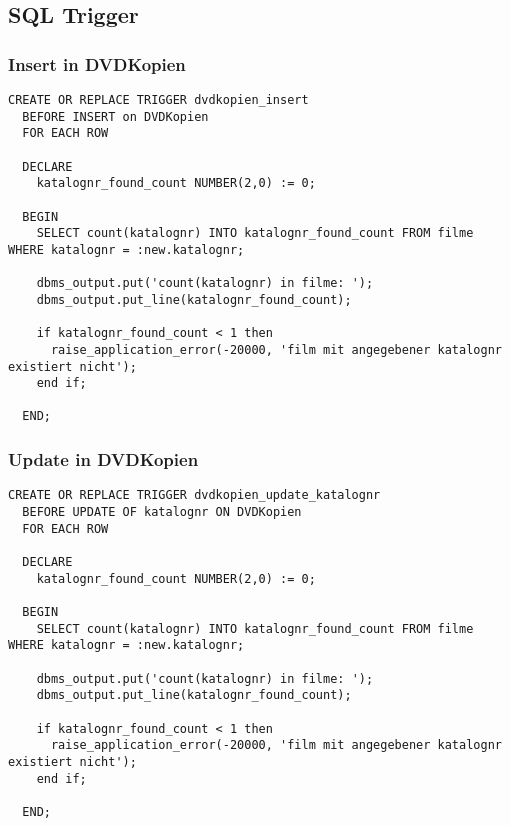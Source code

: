 \documentclass[11pt,a4paper,parskip=half]{scrartcl}
\begin{document}
\subsection{SQL Trigger}
\subsubsection{Insert in DVDKopien}
\begin{lstlisting}
CREATE OR REPLACE TRIGGER dvdkopien_insert
  BEFORE INSERT on DVDKopien
  FOR EACH ROW
  
  DECLARE
    katalognr_found_count NUMBER(2,0) := 0;
    
  BEGIN
    SELECT count(katalognr) INTO katalognr_found_count FROM filme WHERE katalognr = :new.katalognr;
    
    dbms_output.put('count(katalognr) in filme: ');
    dbms_output.put_line(katalognr_found_count);
    
    if katalognr_found_count < 1 then
      raise_application_error(-20000, 'film mit angegebener katalognr existiert nicht');
    end if;
    
  END;
\end{lstlisting}

\subsubsection{Update in DVDKopien}
\begin{lstlisting}
CREATE OR REPLACE TRIGGER dvdkopien_update_katalognr
  BEFORE UPDATE OF katalognr ON DVDKopien
  FOR EACH ROW
  
  DECLARE
    katalognr_found_count NUMBER(2,0) := 0;
    
  BEGIN
    SELECT count(katalognr) INTO katalognr_found_count FROM filme WHERE katalognr = :new.katalognr;
    
    dbms_output.put('count(katalognr) in filme: ');
    dbms_output.put_line(katalognr_found_count);
    
    if katalognr_found_count < 1 then
      raise_application_error(-20000, 'film mit angegebener katalognr existiert nicht');
    end if;
    
  END;
\end{lstlisting}
\end{document}
